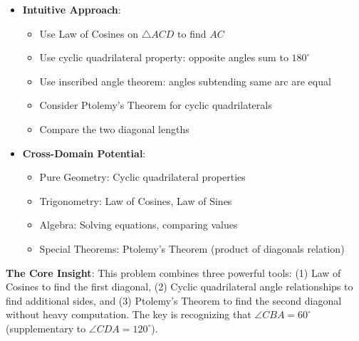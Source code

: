 \documentclass[11pt]{article}
\begin{document}
\begin{problemconfigbox}
\begin{itemize}[leftmargin=*]
    \item \textbf{Intuitive Approach}: 
    \begin{itemize}
        \item Use Law of Cosines on $\triangle ACD$ to find $AC$
        \item Use cyclic quadrilateral property: opposite angles sum to $180^\circ$
        \item Use inscribed angle theorem: angles subtending same arc are equal
        \item Consider Ptolemy's Theorem for cyclic quadrilaterals
        \item Compare the two diagonal lengths
    \end{itemize}
    
    \item \textbf{Cross-Domain Potential}: 
    \begin{itemize}
        \item Pure Geometry: Cyclic quadrilateral properties
        \item Trigonometry: Law of Cosines, Law of Sines
        \item Algebra: Solving equations, comparing values
        \item Special Theorems: Ptolemy's Theorem (product of diagonals relation)
    \end{itemize}
\end{itemize}
\end{problemconfigbox}

\begin{keyinsight}
\textbf{The Core Insight}: This problem combines three powerful tools: (1) Law of Cosines to find the first diagonal, (2) Cyclic quadrilateral angle relationships to find additional sides, and (3) Ptolemy's Theorem to find the second diagonal without heavy computation. The key is recognizing that $\angle CBA = 60^\circ$ (supplementary to $\angle CDA = 120^\circ$).
\end{keyinsight}
\end{document}
